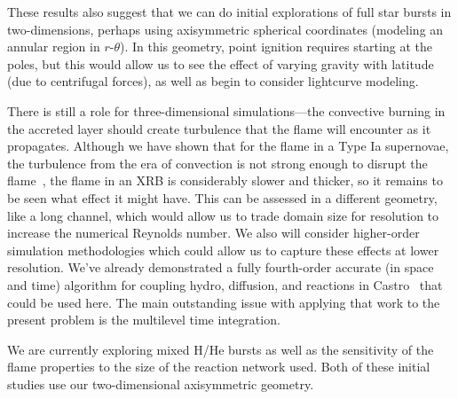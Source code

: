 \documentclass[twocolumn,linenumbers,times,tighten]{aastex631}
\newcommand{\castro}{{\sf Castro}}
\begin{document}
These results also suggest that we can do initial explorations of full
star bursts in two-dimensions, perhaps using axisymmetric spherical
coordinates (modeling an annular region in $r$-$\theta$).  In this
geometry, point ignition requires starting at the poles, but this
would allow us to see the effect of varying gravity with latitude (due
to centrifugal forces), as well as begin to consider lightcurve modeling.

There is still a role for three-dimensional simulations---the
convective burning in the accreted layer should create turbulence that
the flame will encounter as it propagates.  Although we have shown
that for the flame in a Type Ia supernovae, the turbulence from the
era of convection is not strong enough to disrupt the
flame~\citep{wdturb}, the flame in an XRB is considerably slower and
thicker, so it remains to be seen what effect it might have.  This can
be assessed in a different geometry, like a long channel, which would
allow us to trade domain size for resolution to increase the numerical
Reynolds number.  We also will consider higher-order simulation
methodologies which could allow us to capture these effects at lower
resolution.  We've already demonstrated a fully fourth-order accurate
(in space and time) algorithm for coupling hydro, diffusion, and
reactions in \castro~\citep{castro-sdc} that could be used here.  The
main outstanding issue with applying that work to the present problem
is the multilevel time integration.

We are currently exploring mixed H/He bursts as well as the
sensitivity of the flame properties to the size of the reaction
network used.  Both of these initial studies use our two-dimensional
axisymmetric geometry.
\end{document}
